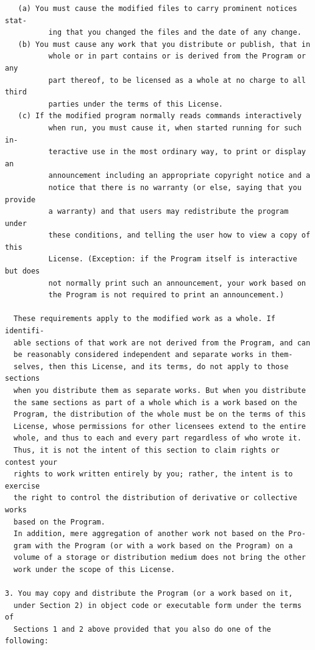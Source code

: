 \documentclass[11pt]{report}
\begin{document}
\begin{appendix}
\begin{verbatim}
   (a) You must cause the modified files to carry prominent notices stat-
          ing that you changed the files and the date of any change.
   (b) You must cause any work that you distribute or publish, that in
          whole or in part contains or is derived from the Program or any
          part thereof, to be licensed as a whole at no charge to all third
          parties under the terms of this License.
   (c) If the modified program normally reads commands interactively
          when run, you must cause it, when started running for such in-
          teractive use in the most ordinary way, to print or display an
          announcement including an appropriate copyright notice and a
          notice that there is no warranty (or else, saying that you provide
          a warranty) and that users may redistribute the program under
          these conditions, and telling the user how to view a copy of this
          License. (Exception: if the Program itself is interactive but does
          not normally print such an announcement, your work based on
          the Program is not required to print an announcement.)

  These requirements apply to the modified work as a whole. If identifi-
  able sections of that work are not derived from the Program, and can
  be reasonably considered independent and separate works in them-
  selves, then this License, and its terms, do not apply to those sections
  when you distribute them as separate works. But when you distribute
  the same sections as part of a whole which is a work based on the
  Program, the distribution of the whole must be on the terms of this
  License, whose permissions for other licensees extend to the entire
  whole, and thus to each and every part regardless of who wrote it.
  Thus, it is not the intent of this section to claim rights or contest your
  rights to work written entirely by you; rather, the intent is to exercise
  the right to control the distribution of derivative or collective works
  based on the Program.
  In addition, mere aggregation of another work not based on the Pro-
  gram with the Program (or with a work based on the Program) on a
  volume of a storage or distribution medium does not bring the other
  work under the scope of this License.

3. You may copy and distribute the Program (or a work based on it,
  under Section 2) in object code or executable form under the terms of
  Sections 1 and 2 above provided that you also do one of the following:


\end{verbatim}
\end{appendix}
\end{document}
